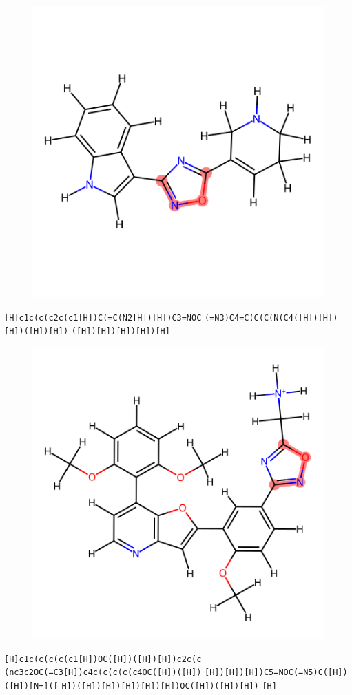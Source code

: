 \documentclass{article}
\begin{document}
\begin{figure}[ht]
\centering
    \includegraphics{mol72.png}
\end{figure}
\verb|[H]c1c(c(c2c(c1[H])C(=C(N2[H])[H])C3=NOC| \verb|(=N3)C4=C(C(C(N(C4([H])[H])[H])([H])[H])| \verb|([H])[H])[H])[H])[H]|

\clearpage

\begin{figure}[ht]
\centering
    \includegraphics{mol73.png}
\end{figure}
\verb|[H]c1c(c(c(c(c1[H])OC([H])([H])[H])c2c(c| \verb|(nc3c2OC(=C3[H])c4c(c(c(c(c4OC([H])([H])| \verb|[H])[H])[H])C5=NOC(=N5)C([H])([H])[N+]([| \verb|H])([H])[H])[H])[H])[H])OC([H])([H])[H])| \verb|[H]|
\end{document}
